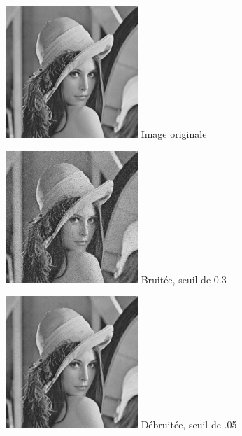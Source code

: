 \documentclass{article}
\begin{document}
		
		\begin{figure}[!ht]
			\centering
			\begin{minipage}[t]{5cm}
				\centering
				\includegraphics[width=5cm,height=5cm]{lena.jpg}
				Image originale
			\end{minipage}
			\begin{minipage}[t]{5cm}
				\centering
				\includegraphics[width=5cm,height=5cm]{Additive/noisy_30.jpg}
				Bruitée, seuil de 0.3
			\end{minipage}
			\begin{minipage}[t]{5cm}
				\centering
				\includegraphics[width=5cm,height=5cm]{Additive/algo2_30.jpg}
				Débruitée, seuil de .05
			\end{minipage}
		\end{figure}
		
\end{document}
